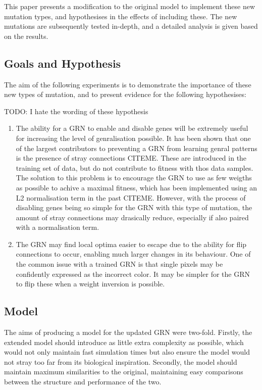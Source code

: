 \documentclass[twocolumn,a4paper,11pt]{article}
\begin{document}
    This paper presents a modification to the original model to implement these new mutation types, and hypothesises in the effects of including these. The new mutations are subsequently tested in-depth, and a detailed analysis is given based on the results.

    \subsection{Goals and Hypothesis}
    The aim of the following experiments is to demonstrate the importance of these new types of mutation, and to present evidence for the following hypothesises:


    TODO: I hate the wording of these hypothesis
    \begin{enumerate}
        \item The ability for a GRN to enable and disable genes will be extremely useful for increasing the level of genralisation possible. It has been shown that one of the largest contributors to preventing a GRN from learning genral patterns is the presence of stray connections CITEME. These are introduced in the training set of data, but do not contribute to fitness with thos data samples. The solution to this problem is to encourage the GRN to use as few weigths as possible to achive a maximal fitness, which has been implemented using an L2 normalisation term in the past CITEME. However, with the process of disabling genes being so simple for the GRN with this type of mutation, the amount of stray connections may drasically reduce, especially if also paired with a normalisation term.
        \item The GRN may find local optima easier to escape due to the ability for flip connections to occur, enabling much larger changes in its behaviour. One of the common issue with a trained GRN is that single pixels may be confidently expressed as the incorrect color. It may be simpler for the GRN to flip these when a weight inversion is possible.
    \end{enumerate}

    \subsection{Model}
    The aims of producing a model for the updated GRN were two-fold. Firstly, the extended model should introduce as little extra complexity as possible, which would not only maintain fast simulation times but also ensure the model would not stray too far from its biological inspiration. Secondly, the model should maintain maximum similarities to the original, maintaining easy comparisons between the structure and performance of the two.
\end{document}
